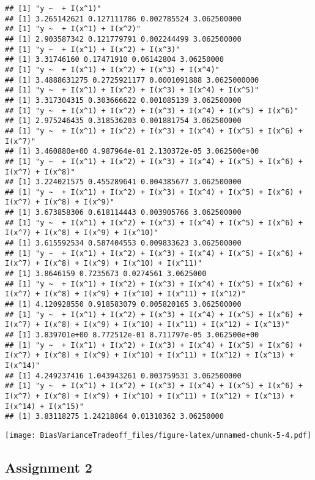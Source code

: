 \documentclass[]{article}
\begin{document}
\begin{verbatim}
## [1] "y ~  + I(x^1)"
## [1] 3.265142621 0.127111786 0.002785524 3.062500000
## [1] "y ~  + I(x^1) + I(x^2)"
## [1] 2.903587342 0.121779791 0.002244499 3.062500000
## [1] "y ~  + I(x^1) + I(x^2) + I(x^3)"
## [1] 3.31746160 0.17471910 0.06142804 3.06250000
## [1] "y ~  + I(x^1) + I(x^2) + I(x^3) + I(x^4)"
## [1] 3.4888631275 0.2725921177 0.0001091888 3.0625000000
## [1] "y ~  + I(x^1) + I(x^2) + I(x^3) + I(x^4) + I(x^5)"
## [1] 3.317304315 0.303666622 0.001085139 3.062500000
## [1] "y ~  + I(x^1) + I(x^2) + I(x^3) + I(x^4) + I(x^5) + I(x^6)"
## [1] 2.975246435 0.318536203 0.001881754 3.062500000
## [1] "y ~  + I(x^1) + I(x^2) + I(x^3) + I(x^4) + I(x^5) + I(x^6) + I(x^7)"
## [1] 3.460880e+00 4.987964e-01 2.130372e-05 3.062500e+00
## [1] "y ~  + I(x^1) + I(x^2) + I(x^3) + I(x^4) + I(x^5) + I(x^6) + I(x^7) + I(x^8)"
## [1] 3.224021575 0.455289641 0.004385677 3.062500000
## [1] "y ~  + I(x^1) + I(x^2) + I(x^3) + I(x^4) + I(x^5) + I(x^6) + I(x^7) + I(x^8) + I(x^9)"
## [1] 3.673858306 0.618114443 0.003905766 3.062500000
## [1] "y ~  + I(x^1) + I(x^2) + I(x^3) + I(x^4) + I(x^5) + I(x^6) + I(x^7) + I(x^8) + I(x^9) + I(x^10)"
## [1] 3.615592534 0.587404553 0.009833623 3.062500000
## [1] "y ~  + I(x^1) + I(x^2) + I(x^3) + I(x^4) + I(x^5) + I(x^6) + I(x^7) + I(x^8) + I(x^9) + I(x^10) + I(x^11)"
## [1] 3.8646159 0.7235673 0.0274561 3.0625000
## [1] "y ~  + I(x^1) + I(x^2) + I(x^3) + I(x^4) + I(x^5) + I(x^6) + I(x^7) + I(x^8) + I(x^9) + I(x^10) + I(x^11) + I(x^12)"
## [1] 4.120928550 0.918583079 0.005820165 3.062500000
## [1] "y ~  + I(x^1) + I(x^2) + I(x^3) + I(x^4) + I(x^5) + I(x^6) + I(x^7) + I(x^8) + I(x^9) + I(x^10) + I(x^11) + I(x^12) + I(x^13)"
## [1] 3.839701e+00 8.772512e-01 8.711797e-05 3.062500e+00
## [1] "y ~  + I(x^1) + I(x^2) + I(x^3) + I(x^4) + I(x^5) + I(x^6) + I(x^7) + I(x^8) + I(x^9) + I(x^10) + I(x^11) + I(x^12) + I(x^13) + I(x^14)"
## [1] 4.249237416 1.043943261 0.003759531 3.062500000
## [1] "y ~  + I(x^1) + I(x^2) + I(x^3) + I(x^4) + I(x^5) + I(x^6) + I(x^7) + I(x^8) + I(x^9) + I(x^10) + I(x^11) + I(x^12) + I(x^13) + I(x^14) + I(x^15)"
## [1] 3.83118275 1.24218864 0.01310362 3.06250000
\end{verbatim}

\texttt{[image: BiasVarianceTradeoff\_files/figure-latex/unnamed-chunk-5-4.pdf]}

\hypertarget{assignment-2}{%
\subsection{Assignment 2}\label{assignment-2}}
\end{document}

